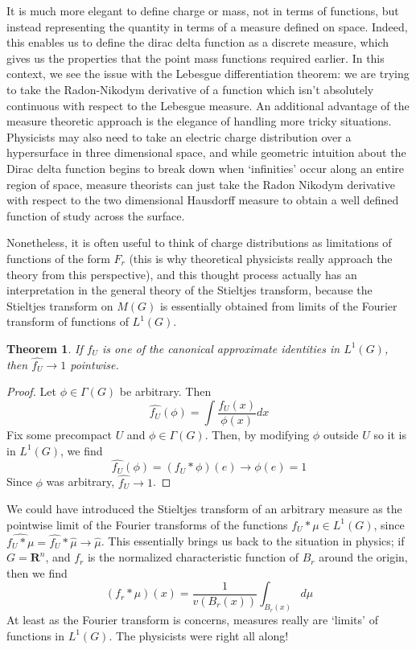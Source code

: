 \documentclass{article}
\theoremstyle{plain}
\newtheorem{theorem}{Theorem}
\theoremstyle{definition}
\begin{document}
It is much more elegant to define charge or mass, not in terms of functions, but instead representing the quantity in terms of a measure defined on space. Indeed, this enables us to define the dirac delta function as a discrete measure, which gives us the properties that the point mass functions required earlier. In this context, we see the issue with the Lebesgue differentiation theorem: we are trying to take the Radon-Nikodym derivative of a function which isn't absolutely continuous with respect to the Lebesgue measure. An additional advantage of the measure theoretic approach is the elegance of handling more tricky situations. Physicists may also need to take an electric charge distribution over a hypersurface in three dimensional space, and while geometric intuition about the Dirac delta function begins to break down when `infinities' occur along an entire region of space, measure theorists can just take the Radon Nikodym derivative with respect to the two dimensional Hausdorff measure to obtain a well defined function of study across the surface.

Nonetheless, it is often useful to think of charge distributions as limitations of functions of the form $F_r$ (this is why theoretical physicists really approach the theory from this perspective), and this thought process actually has an interpretation in the general theory of the Stieltjes transform, because the Stieltjes transform on $M(G)$ is essentially obtained from limits of the Fourier transform of functions of $L^1(G)$.

\begin{theorem}
    If $f_U$ is one of the canonical approximate identities in $L^1(G)$, then $\widehat{f_U} \to 1$ pointwise.
\end{theorem}
\begin{proof}
    Let $\phi \in \Gamma(G)$ be arbitrary. Then
    \[ \widehat{f_U}(\phi) = \int \frac{f_U(x)}{\phi(x)} dx \]
    Fix some precompact $U$ and $\phi \in \Gamma(G)$. Then, by modifying $\phi$ outside $U$ so it is in $L^1(G)$, we find
    \[ \widehat{f_U}(\phi) = (f_U * \phi)(e) \to \phi(e) = 1 \]
    Since $\phi$ was arbitrary, $\widehat{f_U} \to 1$.
\end{proof}

We could have introduced the Stieltjes transform of an arbitrary measure as the pointwise limit of the Fourier transforms of the functions $f_U * \mu \in L^1(G)$, since $\widehat{f_U * \mu} = \widehat{f_U} * \widehat{\mu} \to \widehat{\mu}$. This essentially brings us back to the situation in physics; if $G = \mathbf{R}^n$, and $f_r$ is the normalized characteristic function of $B_r$ around the origin, then we find
%
\[ (f_r * \mu)(x) = \frac{1}{v(B_r(x))} \int_{B_r(x)} d\mu \]
%
At least as the Fourier transform is concerns, measures really are `limits' of functions in $L^1(G)$. The physicists were right all along!
\end{document}
